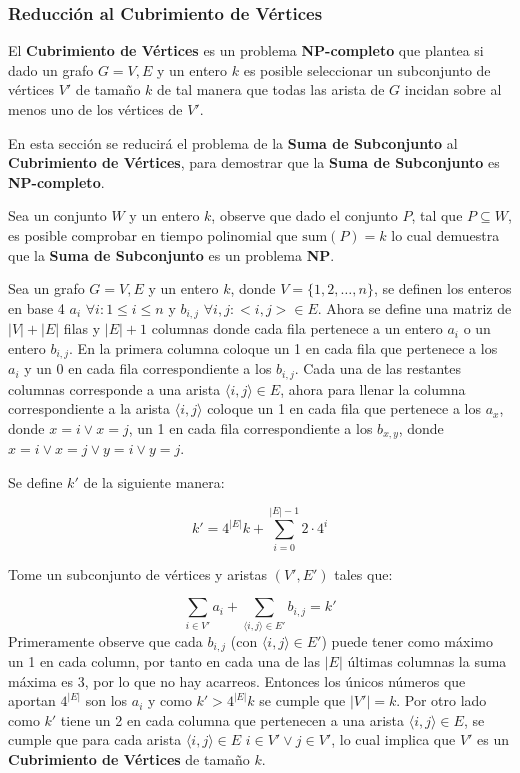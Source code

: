\documentclass{article}
\begin{document}
\subsubsection{Reducción al Cubrimiento de Vértices}

El \textbf{Cubrimiento de Vértices} es un problema \textbf{NP-completo} que plantea si dado un grafo $G=V,E$ y un entero $k$ es posible
seleccionar un subconjunto de vértices $V'$ de tamaño $k$ de tal manera que todas las arista de $G$ incidan sobre al menos
uno de los vértices de $V'$.

En esta sección se reducirá el problema de la \textbf{Suma de Subconjunto} al \textbf{Cubrimiento de Vértices}, para demostrar
que la \textbf{Suma de Subconjunto} es \textbf{NP-completo}.

Sea un conjunto $W$ y un entero $k$, observe que dado el conjunto $P$, tal que $P\subseteq W$, es posible comprobar en tiempo polinomial que $\text{sum}(P)=k$
lo cual demuestra que la \textbf{Suma de Subconjunto} es un problema \textbf{NP}.

Sea un grafo $G=V,E$ y un entero $k$, donde $V=\{1,2,\ldots,n\}$, se definen los enteros en base 4 $a_i$ $\forall i : 1\leq i \leq n$ y $b_{i,j}$ $\forall i,j : <i,j> \in E$.
Ahora se define una matriz de $|V|+|E|$ filas y $|E|+1$ columnas donde cada fila pertenece a un entero $a_i$ o un entero $b_{i,j}$. En la primera
columna coloque un 1 en cada fila que pertenece a los $a_i$ y un 0 en cada fila correspondiente a los $b_{i,j}$. Cada una de las restantes columnas
corresponde a una arista $\langle i,j \rangle\in E$, ahora para llenar la columna correspondiente a la arista $\langle i,j \rangle$ coloque un 1 en cada
fila que pertenece a los $a_x$, donde $x=i\vee x=j$, un 1 en cada fila correspondiente a los $b_{x,y}$, donde $x=i \vee x=j \vee y=i \vee y=j$.

Se define $k'$ de la siguiente manera:

\begin{equation}
    k'=4^{|E|}k+\sum_{i=0}^{|E|-1}2\cdot 4^i
\end{equation}

Tome un subconjunto de vértices y aristas $(V', E')$ tales que:

\begin{equation}
    \sum_{i\in V'} a_i + \sum_{\langle i,j\rangle \in E'} b_{i,j} = k'
\end{equation}
Primeramente observe que cada $b_{i,j}$ (con $\langle i,j\rangle \in E'$) puede tener como máximo un 1 en cada column, por tanto en cada una de
las $|E|$ últimas columnas la suma máxima es 3, por lo que no hay acarreos. Entonces los únicos números que aportan
$4^{|E|}$ son los $a_i$ y como $k'>4^{|E|}k$ se cumple que $|V'|=k$. Por otro lado como $k'$ tiene un 2 en cada columna que pertenecen
a una arista $\langle i,j\rangle \in E$, se cumple que para cada arista $\langle i,j\rangle \in E$ $i\in V'\vee j\in V'$, lo cual implica
que $V'$ es un \textbf{Cubrimiento de Vértices} de tamaño $k$.
\end{document}
